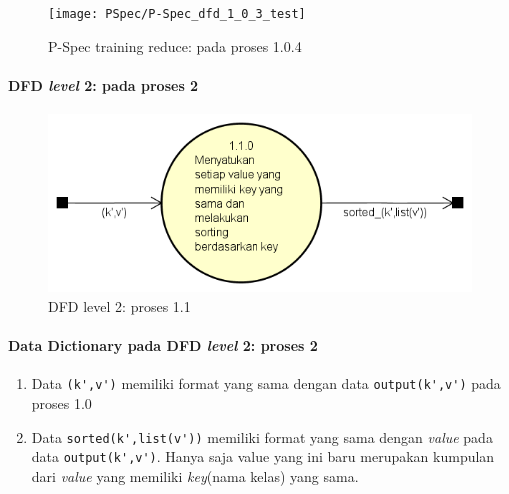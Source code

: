 \begin{figure}[H]
	\centering
	\texttt{[image: PSpec/P-Spec\_dfd\_1\_0\_3\_test]}
	\caption[P-Spec training reduce: pada proses 1.0.4]{P-Spec training reduce: pada proses 1.0.4}
	\label{fig:P-Spec training reduce: pada proses 1.0.4}
\end{figure}


\paragraph{DFD \textit{level} 2: pada proses 2}
\begin{figure}[H]
	\centering
	\includegraphics[scale=0.65]{Diagram/DFD_1_2_Training_Test_SS}
	\caption[DFD level 2: proses 1.1]{DFD level 2: proses 1.1}
	\label{fig:DFD level 2: proses 1.1}
\end{figure}

\paragraph{Data Dictionary pada DFD \textit{level} 2: proses 2}
\begin{enumerate}
	\item{Data \verb|(k',v')|} memiliki format yang sama dengan data \verb|output(k',v')| pada proses 1.0
	
	\item{Data \verb|sorted(k',list(v'))|} memiliki format yang sama dengan \textit{value} pada data \verb|output(k',v')|. Hanya saja value yang ini baru merupakan kumpulan dari \textit{value} yang memiliki \textit{key}(nama kelas) yang sama.

\end{enumerate}

